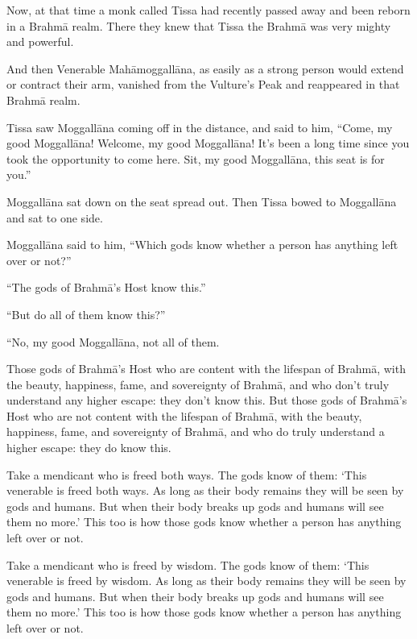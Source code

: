\documentclass[12pt,openany]{book}%
\begin{document}
Now, at that time a monk called Tissa had recently passed away and been reborn in a \textsanskrit{Brahmā} realm. There they knew that Tissa the \textsanskrit{Brahmā} was very mighty and powerful. 

And then Venerable \textsanskrit{Mahāmoggallāna}, as easily as a strong person would extend or contract their arm, vanished from the Vulture’s Peak and reappeared in that \textsanskrit{Brahmā} realm. 

Tissa saw \textsanskrit{Moggallāna} coming off in the distance, and said to him, “Come, my good \textsanskrit{Moggallāna}! Welcome, my good \textsanskrit{Moggallāna}! It’s been a long time since you took the opportunity to come here. Sit, my good \textsanskrit{Moggallāna}, this seat is for you.” 

\textsanskrit{Moggallāna} sat down on the seat spread out. Then Tissa bowed to \textsanskrit{Moggallāna} and sat to one side. 

\textsanskrit{Moggallāna} said to him, “Which gods know whether a person has anything left over or not?” 

“The gods of \textsanskrit{Brahmā}’s Host know this.” 

“But do all of them know this?” 

“No, my good \textsanskrit{Moggallāna}, not all of them. 

Those gods of \textsanskrit{Brahmā}’s Host who are content with the lifespan of \textsanskrit{Brahmā}, with the beauty, happiness, fame, and sovereignty of \textsanskrit{Brahmā}, and who don’t truly understand any higher escape: they don’t know this. But those gods of \textsanskrit{Brahmā}’s Host who are not content with the lifespan of \textsanskrit{Brahmā}, with the beauty, happiness, fame, and sovereignty of \textsanskrit{Brahmā}, and who do truly understand a higher escape: they do know this. 

Take a mendicant who is freed both ways. The gods know of them: ‘This venerable is freed both ways. As long as their body remains they will be seen by gods and humans. But when their body breaks up gods and humans will see them no more.’ This too is how those gods know whether a person has anything left over or not. 

Take a mendicant who is freed by wisdom. The gods know of them: ‘This venerable is freed by wisdom. As long as their body remains they will be seen by gods and humans. But when their body breaks up gods and humans will see them no more.’ This too is how those gods know whether a person has anything left over or not. 
\end{document}
